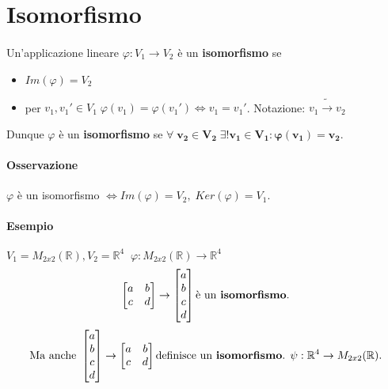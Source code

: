 \documentclass[a4paper, 12pt]{report}
\begin{document}
        \section{Isomorfismo}
        \paragraph{} Un'applicazione lineare $\varphi: V_1 \rightarrow V_2$ è un \textbf{isomorfismo} se 
        \begin{itemize}
            \item $Im(\varphi)=V_2$ 
            \item per $v_1,v_1' \in V_1 \; \varphi(v_1)=\varphi(v_1') \Leftrightarrow v_1=v_1'$. Notazione: $v_1 \tilde{\rightarrow} v_2$
        \end{itemize}
        Dunque $\varphi$ è un \textbf{isomorfismo} se $\boldsymbol{\forall \; v_2 \in V_2 \; \exists! v_1 \in V_1:\varphi(v_1)=v_2}$.
        \paragraph{Osservazione} $\varphi$ è un isomorfismo $\Leftrightarrow Im(\varphi)=V_2, \; Ker(\varphi)=V_1$.
        \paragraph{Esempio} $V_1=M_{2x2}(\mathbb{R}), V_2=\mathbb{R}^4 \; \; \varphi:M_{2x2}(\mathbb{R})\rightarrow \mathbb{R}^4$
        $$
        \begin{bmatrix}
            a & b\\
            c & d
        \end{bmatrix}
        \rightarrow
        \begin{bmatrix}
            a\\
            b\\
            c\\
            d
        \end{bmatrix}
        \text{è un \textbf{isomorfismo}.}
        $$
        $$
        \text{Ma anche }
        \begin{bmatrix}
            a\\
            b\\
            c\\
            d
        \end{bmatrix}
        \rightarrow
        \begin{bmatrix}
            a & b\\
            c & d
        \end{bmatrix}
        \text{definisce un \textbf{isomorfismo}. }
        \psi : \mathbb{R}^4 \rightarrow M_{2x2}(\mathbb{R}).
        $$
\end{document}
